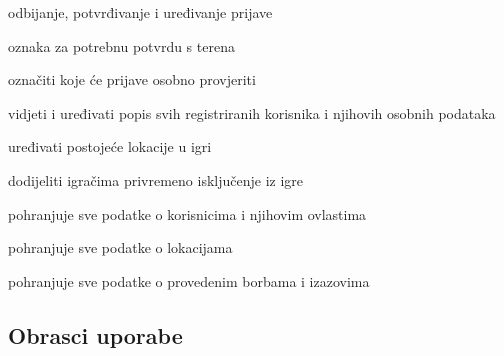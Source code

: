 \begin{packed_enum}
\begin{packed_enum}
			        \begin{packed_enum}
			            
			            \item odbijanje, potvrđivanje i uređivanje prijave
			            \item oznaka za potrebnu potvrdu s terena
			          
			        \end{packed_enum}
			        
			        \item označiti koje će prijave osobno provjeriti
			        
			    \end{packed_enum}
			    
		    \item {}
		    
		        \begin{packed_enum}
		            
		            \item vidjeti i uređivati popis svih registriranih korisnika i njihovih osobnih podataka
		            \item uređivati postojeće lokacije u igri
		            \item dodijeliti igračima privremeno isključenje iz igre
		            
		        \end{packed_enum}
		        
	        \item {}
		    
		        \begin{packed_enum}
		            
		            \item pohranjuje sve podatke o korisnicima i njihovim ovlastima
		            \item pohranjuje sve podatke o lokacijama
		            \item pohranjuje sve  podatke o provedenim borbama i izazovima
		            
		        \end{packed_enum}
		        
			\end{packed_enum}
			
			\eject 
			
			
				
			\subsection{Obrasci uporabe}
				
